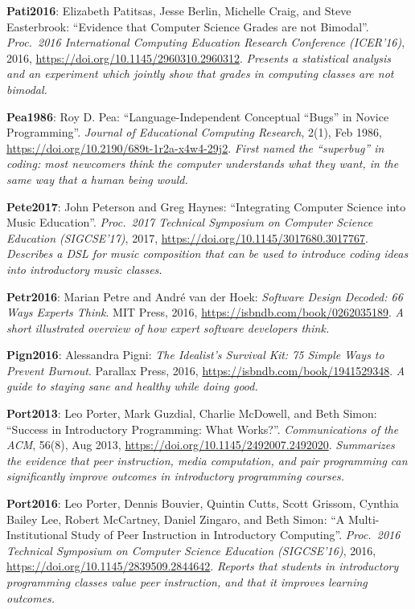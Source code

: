 \textbf{\hypertarget{b:Pati2016}{Pati2016}\label{b:Pati2016}}: Elizabeth Patitsas, Jesse Berlin, Michelle Craig, and Steve Easterbrook: ``Evidence that Computer Science Grades are not Bimodal''. \emph{Proc.\ 2016 International Computing Education Research Conference (ICER'16)}, 2016, \url{https://doi.org/10.1145/2960310.2960312}. \emph{Presents a statistical analysis and an experiment which jointly show that grades in computing classes are not bimodal.}

\textbf{\hypertarget{b:Pea1986}{Pea1986}\label{b:Pea1986}}: Roy D. Pea: ``Language-Independent Conceptual ``Bugs'' in Novice Programming''. \emph{Journal of Educational Computing Research}, 2(1), Feb 1986, \url{https://doi.org/10.2190/689t-1r2a-x4w4-29j2}. \emph{First named the ``superbug'' in coding: most newcomers think the computer understands what they want, in the same way that a human being would.}

\textbf{\hypertarget{b:Pete2017}{Pete2017}\label{b:Pete2017}}: John Peterson and Greg Haynes: ``Integrating Computer Science into Music Education''. \emph{Proc.\ 2017 Technical Symposium on Computer Science Education (SIGCSE'17)}, 2017, \url{https://doi.org/10.1145/3017680.3017767}. \emph{Describes a DSL for music composition that can be used to introduce coding ideas into introductory music classes.}

\textbf{\hypertarget{b:Petr2016}{Petr2016}\label{b:Petr2016}}: Marian Petre and André van der Hoek: \emph{Software Design Decoded: 66 Ways Experts Think}. MIT Press, 2016, \url{https://isbndb.com/book/0262035189}. \emph{A short illustrated overview of how expert software developers think.}

\textbf{\hypertarget{b:Pign2016}{Pign2016}\label{b:Pign2016}}: Alessandra Pigni: \emph{The Idealist's Survival Kit: 75 Simple Ways to Prevent Burnout}. Parallax Press, 2016, \url{https://isbndb.com/book/1941529348}. \emph{A guide to staying sane and healthy while doing good.}

\textbf{\hypertarget{b:Port2013}{Port2013}\label{b:Port2013}}: Leo Porter, Mark Guzdial, Charlie McDowell, and Beth Simon: ``Success in Introductory Programming: What Works?''. \emph{Communications of the ACM}, 56(8), Aug 2013, \url{https://doi.org/10.1145/2492007.2492020}. \emph{Summarizes the evidence that peer instruction, media computation, and pair programming can significantly improve outcomes in introductory programming courses.}

\textbf{\hypertarget{b:Port2016}{Port2016}\label{b:Port2016}}: Leo Porter, Dennis Bouvier, Quintin Cutts, Scott Grissom, Cynthia Bailey Lee, Robert McCartney, Daniel Zingaro, and Beth Simon: ``A Multi-Institutional Study of Peer Instruction in Introductory Computing''. \emph{Proc.\ 2016 Technical Symposium on Computer Science Education (SIGCSE'16)}, 2016, \url{https://doi.org/10.1145/2839509.2844642}. \emph{Reports that students in introductory programming classes value peer instruction, and that it improves learning outcomes.}

